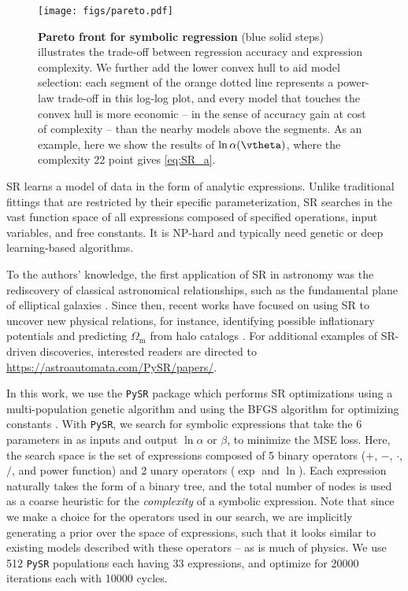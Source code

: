 \documentclass[12pt, a4paper]{article}
\newcommand{\Omegam}{\Omega_\mathrm{m}}
\newcommand{\ap}{\alpha}
\newcommand{\tilt}{\beta}
\begin{document}
\begin{figure}[tb]
\centering
\texttt{[image: figs/pareto.pdf]}
\caption{\textbf{Pareto front for symbolic regression} (blue solid
steps) illustrates the trade-off between regression accuracy and
expression complexity.
We further add the lower convex hull to aid model selection: each
segment of the orange dotted line represents a power-law trade-off in
this log-log plot, and every model that touches the convex hull is more
economic -- in the sense of accuracy gain at cost of complexity -- than
the nearby models above the segments.
As an example, here we show the results of $\ln\ap(\vtheta)$, where the
complexity 22 point gives \cref{eq:SR_a}.}
\label{fig:pareto}
\end{figure}

SR learns a model of data in the form of analytic expressions.
Unlike traditional fittings that are restricted by their specific
parameterization, SR searches in the vast function space of all
expressions composed of specified operations, input variables, and free
constants.
It is NP-hard \cite{SongEtAl2024, VirgolinPissis2022} and typically need
genetic or deep learning-based algorithms.

To the authors' knowledge, the first application of SR in astronomy was
the rediscovery of classical astronomical relationships, such as the
fundamental plane of elliptical galaxies \cite{Graham2013}.
Since then, recent works have focused on using SR to uncover new
physical relations, for instance, identifying possible inflationary
potentials \cite{Sousa2024} and predicting $\Omegam$ from halo catalogs
\cite{Shao2023}.
For additional examples of SR-driven discoveries, interested readers are
directed to \url{https://astroautomata.com/PySR/papers/}.

In this work, we use the \texttt{PySR} package \cite{Cranmer2020b,
Cranmer2023} which performs SR optimizations using a multi-population
genetic algorithm and using the BFGS algorithm for optimizing constants
\cite{NocedalWright2006}.
With \texttt{PySR}, we search for symbolic expressions that take the 6
parameters in  as inputs and output $\ln\ap$ or $\tilt$,
to minimize the MSE loss.
Here, the search space is the set of expressions composed of 5 binary
operators ($+$, $-$, $\cdot$, $/$, and power function) and 2 unary
operators ($\exp$ and $\ln$).
Each expression naturally takes the form of a binary tree, and the total
number of nodes is used as a coarse heuristic for the \emph{complexity}
of a symbolic expression.
Note that since we make a choice for the operators used in our search,
we are implicitly generating a prior over the space of expressions, such
that it looks similar to existing models described with these operators
-- as is much of physics.
We use 512 \texttt{PySR} populations each having 33 expressions, and
optimize for 20000 iterations each with 10000 cycles.
\end{document}

